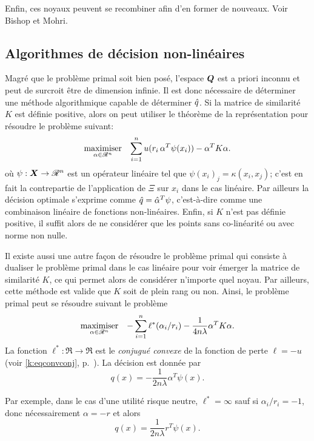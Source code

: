Enfin, ces noyaux peuvent se recombiner afin d'en former de nouveaux. Voir Bishop et
Mohri.


\subsection{Algorithmes de décision non-linéaires}
\label{k:alg}

Magré que le problème primal soit bien posé, l'espace $\Q$ est a priori inconnu et peut de
surcroit être de dimension infinie. Il est donc nécessaire de déterminer une méthode
algorithmique capable de déterminer $\qh$. Si la matrice de similarité $K$ est définie
positive, alors on peut utiliser le théorème de la représentation pour résoudre le
problème suivant:
\begin{equation}
  \maximizeEquation[\alpha \in \Re^n]{\sumi u(r_i\,\alpha^T\psi(x_i)) - \alpha^TK\alpha.}
\end{equation}
où $\psi:\X\to\Re^n$ est un opérateur linéaire tel que $\psi(x_i)_j = \kappa(x_i,x_j)$; c'est en fait la
contrepartie de l'application de $\Xi$ sur $x_i$ dans le cas linéaire. Par ailleurs la
décision optimale s'exprime comme $\qh = \hat\alpha^T\psi$, c'est-à-dire comme une combinaison
linéaire de fonctions non-linéaires. Enfin, si $K$ n'est pas définie positive, il suffit
alors de ne considérer que les points sans co-linéarité ou avec norme non nulle.

Il existe aussi une autre façon de résoudre le problème primal qui consiste à dualiser le
problème primal dans le cas linéaire pour voir émerger la matrice de similarité $K$, ce
qui permet alors de considérer n'importe quel noyau. Par ailleurs, cette méthode est
valide que $K$ soit de plein rang ou non. Ainsi, le problème primal peut se résoudre
suivant le problème
\begin{equation}
  \maximizeEquation[\alpha \in \Re^n]{-\sumi \ell^*(\alpha_i/r_i) - \frac{1}{4n\lambda}\alpha^TK\alpha.}
\end{equation}
La fonction $\ell^*:\Re\to\Re$ est le \textit{conjugué convexe} de la fonction de perte
$\ell = -u$ (voir \eqref{k:eqconvconj}, p.~\pageref{k:eqconvconj}). La décision est donnée
par
\begin{equation}
  q(x) = -\frac{1}{2n\lambda}\alpha^T\psi(x).
\end{equation}

Par exemple, dans le cas d'une utilité risque neutre, $\ell^* = \infty$ sauf si
$\alpha_i/r_i=-1$, donc nécessairement $\alpha = -r$ et alors
\begin{equation}
  q(x) = \frac{1}{2n\lambda} r^T\psi(x).
\end{equation}

